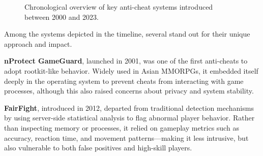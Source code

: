 \begin{figure}[h!]
    \centering
    \caption{Chronological overview of key anti-cheat systems introduced between 2000 and 2023.}
    \label{fig:timeline-anticheat-balanced}
\end{figure}

Among the systems depicted in the timeline, several stand out for their unique approach and impact.

\textbf{nProtect GameGuard}, launched in 2001, was one of the first anti-cheats to adopt rootkit-like behavior. Widely used in Asian MMORPGs, it embedded itself deeply in the operating system to prevent cheats from interacting with game processes, although this also raised concerns about privacy and system stability.

\textbf{FairFight}, introduced in 2012, departed from traditional detection mechanisms by using server-side statistical analysis to flag abnormal player behavior. Rather than inspecting memory or processes, it relied on gameplay metrics such as accuracy, reaction time, and movement patterns—making it less intrusive, but also vulnerable to both false positives and high-skill players.

